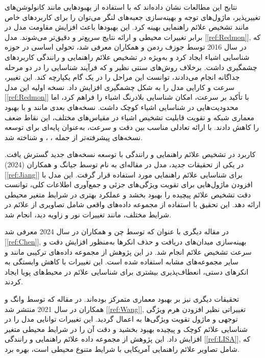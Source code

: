 نتایج این مطالعات نشان داده‌اند که با استفاده از بهبودهایی مانند کانولوشن‌های تغییرپذیر، ماژول‌های توجه و بهینه‌سازی جعبه‌های لنگر می‌توان  را برای کاربردهای خاص مانند تشخیص علائم راهنمایی بهینه کرد. این بهبودها باعث افزایش مقاومت مدل در برابر تغییرات محیطی و ارائه نتایج سریع‌تر و دقیق‌تر می‌شوند.  
مدل  [\ref{ref:Redmon}], که در سال 2016 توسط جوزف ردمن و همکاران معرفی شد، تحولی اساسی در حوزه شناسایی اشیاء ایجاد کرد و به‌ویژه در تشخیص علائم راهنمایی و رانندگی کاربردهای چشمگیری داشت. برخلاف روش‌های سنتی نظیر  و  که فرآیند شناسایی را در دو مرحله جداگانه انجام می‌دادند،  توانست این مراحل را در یک گام یکپارچه کند. این تغییر، سرعت و کارایی مدل را به شکل چشمگیری افزایش داد. نسخه اولیه این مدل [\ref{ref:Redmon}] با تأکید بر سرعت، امکان شناسایی بلادرنگ اشیاء را فراهم کرد، اما محدودیت‌هایی در شناسایی اشیاء کوچک داشت. نسخه‌های بعدی مانند  و  با بهبود معماری شبکه و تقویت قابلیت تشخیص اشیاء در مقیاس‌های مختلف، این نقاط ضعف را کاهش دادند.  با ارائه تعادلی مناسب بین دقت و سرعت، به‌عنوان پایه‌ای برای توسعه نسخه‌های پیشرفته‌تر از جمله ، ، و  شناخته شد.

کاربرد  در تشخیص علائم راهنمایی و رانندگی با توسعه نسخه‌های جدید گسترش یافت. در یکی از تحقیقات جدید، مدل  در مقاله‌ای به نام  توسط جیانگ و همکاران (2024) [\ref{ref:Jiang}] برای شناسایی علائم راهنمایی مورد استفاده قرار گرفت. این مدل با افزودن ماژول‌هایی برای تقویت ویژگی‌های جزئی و جمع‌آوری اطلاعات کلی، توانست دقت تشخیص علائم پیچیده را بهبود بخشد و عملکرد بهتری در شرایط متغیر محیطی ارائه دهد. این تحقیق با استفاده از مجموعه داده‌های واقعی شامل تصاویری از علائم در شرایط مختلف، مانند تغییرات نور و زاویه دید، انجام شد.

در مقاله دیگری با عنوان  که توسط چن و همکاران در سال 2024 معرفی شد [\ref{ref:Chen}], بهینه‌سازی میدان‌های دریافت و حذف انکرها به‌منظور افزایش دقت و سرعت تشخیص علائم انجام شد. در این پژوهش از مجموعه داده‌های ترکیبی مانند  و سایر مجموعه‌های مشابه استفاده شده است. این تغییرات با کاهش وابستگی به انکرهای دستی، انعطاف‌پذیری بیشتری برای شناسایی علائم در محیط‌های پویا ایجاد کردند.

تحقیقات دیگری نیز بر بهبود معماری  متمرکز بوده‌اند. در مقاله  که توسط وانگ و همکاران در سال 2021 منتشر شد [\ref{ref:Wang}], تغییراتی نظیر افزودن هرم ویژگی توجهی و ماژول تقویت ویژگی‌ها به  اعمال گردید. این تغییرات توانایی مدل را در شناسایی علائم کوچک و پیچیده بهبود بخشید و دقت آن را در شرایط محیطی متغیر افزایش داد. این پژوهش از مجموعه داده علائم راهنمایی و رانندگی  [\ref{ref:LISA}], که شامل تصاویر علائم راهنمایی آمریکایی با شرایط متنوع محیطی است، بهره برد.

